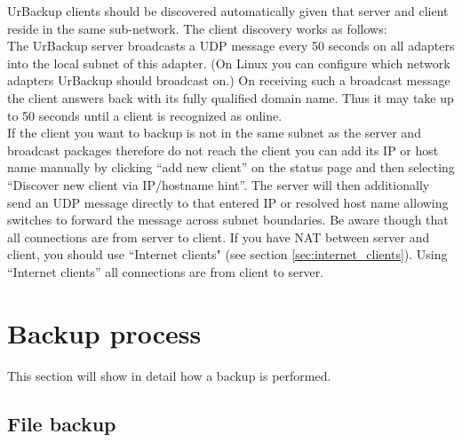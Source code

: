 \documentclass[a4paper,10pt]{article}
\begin{document}
UrBackup clients should be discovered automatically given that server and client reside
in the same sub-network. The client discovery works as follows:\\
The UrBackup server broadcasts a UDP message every 50 seconds on all adapters into the
local subnet of this adapter. (On Linux you can configure which network adapters UrBackup should broadcast on.)
On receiving such a broadcast message the client answers back with its fully qualified domain name.
Thus it may take up to 50 seconds until a client is recognized as online.\\
If the client you want to backup is not in the same subnet as the server and broadcast packages therefore
do not reach the client you can add
its IP or host name manually by clicking ``add new client'' on the status page and then selecting ``Discover new client via IP/hostname hint''. The server will then additionally send an UDP message directly to that
entered IP or resolved host name allowing switches to forward the message across subnet boundaries.
Be aware though that all connections are from server to client. If you have NAT between server and client,
you should use ``Internet clients" (see section \ref{sec:internet_clients}). Using ``Internet clients'' all connections
are from client to server.

\section{Backup process}
\label{sec_backup_process}

This section will show in detail how a backup is performed.

\subsection{File backup}
\end{document}
